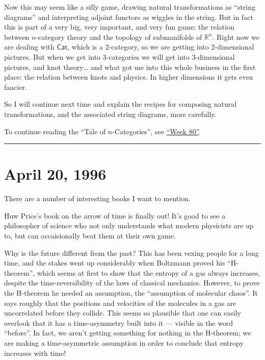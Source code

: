 \documentclass{article}
\begin{document}
Now this may seem like a silly game, drawing natural transformations as
``string diagrams'' and interpreting adjoint functors as wiggles in the
string. But in fact this is part of a very big, very important, and very
fun game: the relation between \(n\)-category theory and the topology of
submanifolds of \(\mathbb{R}^n\). Right now we are dealing with
\(\mathsf{Cat}\), which is a 2-category, so we are getting into
2-dimensional pictures. But when we get into 3-categories we will get
into 3-dimensional pictures, and knot theory\ldots{} and what got me
into this whole business in the first place: the relation between knots
and physics. In higher dimensions it gets even fancier.

So I will continue next time and explain the recipes for composing
natural transformations, and the associated string diagrams, more
carefully.

To continue reading the ``Tale of \(n\)-Categories'', see
\protect\hyperlink{week80}{``Week 80''}.

\begin{center}\rule{0.5\linewidth}{0.5pt}\end{center}
\hypertarget{week80}{%
\section{April 20, 1996}\label{week80}}

There are a number of interesting books I want to mention.

Huw Price's book on the arrow of time is finally out! It's good to see a
philosopher of science who not only understands what modern physicists
are up to, but can occaisionally beat them at their own game.

Why is the future different from the past? This has been vexing people
for a long time, and the stakes went up considerably when Boltzmann
proved his ``H-theorem'', which seems at first to show that the entropy
of a gas always increases, despite the time-reversibility of the laws of
classical mechanics. However, to prove the H-theorem he needed an
assumption, the ``assumption of molecular chaos''. It says roughly that
the positions and velocities of the molecules in a gas are uncorrelated
before they collide. This seems so plausible that one can easily
overlook that it has a time-asymmetry built into it --- visible in the
word ``before''. In fact, we aren't getting something for nothing in the
H-theorem; we are making a time-asymmetric assumption in order to
conclude that entropy increases with time!
\end{document}
